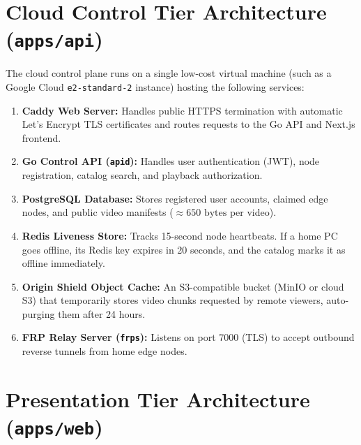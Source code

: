 \section{Cloud Control Tier Architecture (\texttt{apps/api})}
\label{sec:arch_cloud}

The cloud control plane runs on a single low-cost virtual machine (such as a Google Cloud \texttt{e2-standard-2} instance) hosting the following services:

\begin{enumerate}
    \item \textbf{Caddy Web Server:} Handles public HTTPS termination with automatic Let's Encrypt TLS certificates and routes requests to the Go API and Next.js frontend.
    \item \textbf{Go Control API (\texttt{apid}):} Handles user authentication (JWT), node registration, catalog search, and playback authorization.
    \item \textbf{PostgreSQL Database:} Stores registered user accounts, claimed edge nodes, and public video manifests ($\approx 650\text{ bytes}$ per video).
    \item \textbf{Redis Liveness Store:} Tracks 15-second node heartbeats. If a home PC goes offline, its Redis key expires in 20 seconds, and the catalog marks it as offline immediately.
    \item \textbf{Origin Shield Object Cache:} An S3-compatible bucket (MinIO or cloud S3) that temporarily stores video chunks requested by remote viewers, auto-purging them after 24 hours.
    \item \textbf{FRP Relay Server (\texttt{frps}):} Listens on port 7000 (TLS) to accept outbound reverse tunnels from home edge nodes.
\end{enumerate}

\section{Presentation Tier Architecture (\texttt{apps/web})}
\label{sec:arch_web}

